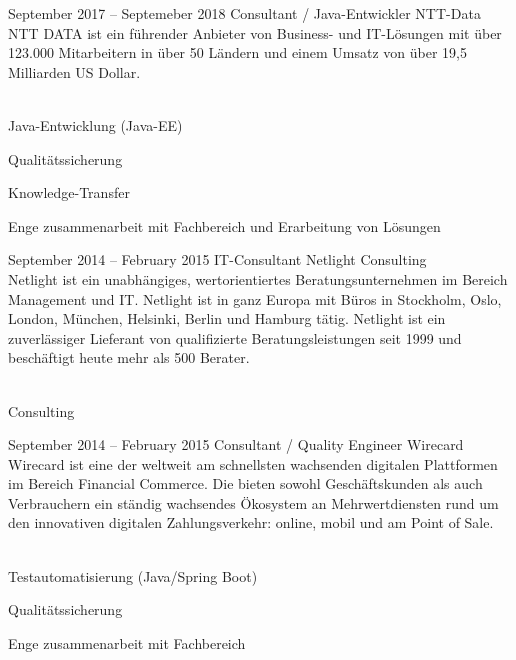 \documentclass[fontsize=10pt]{tccv}
\begin{document}
\begin{eventlist}
\item{September 2017 -- Septemeber 2018}
     {Consultant / Java-Entwickler}
     {NTT-Data}
\\
NTT DATA ist ein führender Anbieter von Business- und IT-Lösungen mit über
123.000 Mitarbeitern in über 50 Ländern und einem Umsatz von über 19,5
Milliarden US Dollar.
\\\\
\begin{assignments}
\item{Java-Entwicklung (Java-EE)}
\item{Qualitätssicherung}
\item{Knowledge-Transfer}
\item{Enge zusammenarbeit mit Fachbereich und Erarbeitung von Lösungen}
\end{assignments}

\item{September 2014 -- February 2015}
     {IT-Consultant}
     {Netlight Consulting}
\\
Netlight ist ein unabhängiges, wertorientiertes Beratungsunternehmen im Bereich
Management und IT. Netlight ist in ganz Europa mit Büros in Stockholm,
Oslo, London, München, Helsinki, Berlin und Hamburg tätig. Netlight ist
ein zuverlässiger Lieferant von qualifizierte Beratungsleistungen seit
1999 und beschäftigt heute mehr als 500 Berater.
\\\\
\begin{assignments}
\item{Consulting}
\end{assignments}

\item{September 2014 -- February 2015}
      {Consultant / Quality Engineer}
      {Wirecard}
\\
Wirecard ist eine der weltweit am schnellsten wachsenden digitalen Plattformen
im Bereich Financial Commerce. Die bieten sowohl Geschäftskunden als
auch Verbrauchern ein ständig wachsendes Ökosystem an Mehrwertdiensten
rund um den innovativen digitalen Zahlungsverkehr: online, mobil und am
Point of Sale.
\\\\
\begin{assignments}
\item{Testautomatisierung (Java/Spring Boot)}
\item{Qualitätssicherung}
\item{Enge zusammenarbeit mit Fachbereich}
\end{assignments}


\end{eventlist}
\end{document}
